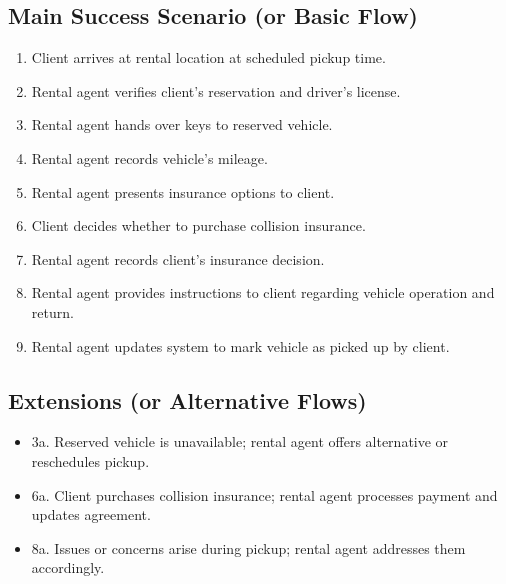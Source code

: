 \documentclass[11pt]{article}
\begin{document}
\subsection*{Main Success Scenario (or Basic Flow)}
\label{sec:org715b757}
\begin{enumerate}
\item Client arrives at rental location at scheduled pickup time.
\item Rental agent verifies client's reservation and driver's license.
\item Rental agent hands over keys to reserved vehicle.
\item Rental agent records vehicle's mileage.
\item Rental agent presents insurance options to client.
\item Client decides whether to purchase collision insurance.
\item Rental agent records client's insurance decision.
\item Rental agent provides instructions to client regarding vehicle operation and return.
\item Rental agent updates system to mark vehicle as picked up by client.
\end{enumerate}
\subsection*{Extensions (or Alternative Flows)}
\label{sec:orgf988246}
\begin{itemize}
\item 3a. Reserved vehicle is unavailable; rental agent offers alternative or reschedules pickup.
\item 6a. Client purchases collision insurance; rental agent processes payment and updates agreement.
\item 8a. Issues or concerns arise during pickup; rental agent addresses them accordingly.
\end{itemize}
\end{document}
